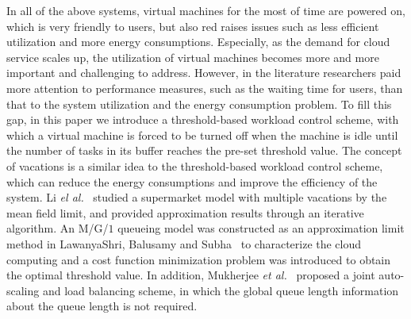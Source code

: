 \documentclass[12pt]{article}
\begin{document}
 In all of the above systems, virtual machines for the most of time are powered on, which is very friendly to users, but also red raises issues such as less efficient utilization and more energy consumptions. Especially, as the demand for cloud service scales up, the utilization of virtual machines becomes more and more important and challenging to address. However, in the literature researchers paid more attention to performance measures, such as the waiting time for users, than that to the system utilization and the energy consumption problem. To fill this gap, in this paper we introduce a threshold-based workload control scheme, with which a virtual machine is forced to be turned off when the machine is idle until the number of tasks in its buffer reaches the pre-set threshold value. The concept of vacations is a similar idea to the threshold-based workload control scheme, which can reduce the energy consumptions and improve the efficiency of the system. Li \textit{el al.}~\cite{lql} studied a supermarket model with multiple vacations by the mean field limit, and provided approximation results through an iterative algorithm. An M/G/$1$ queueing model was constructed as an approximation limit method in LawanyaShri, Balusamy and Subha~\cite{MBS} to characterize the cloud computing and a cost function minimization problem was introduced to obtain the optimal threshold value. In addition, Mukherjee \textit{et al.}~\cite{tabs} proposed a joint auto-scaling and load balancing scheme, in which the global queue length information about the queue length is not required.
\end{document}
